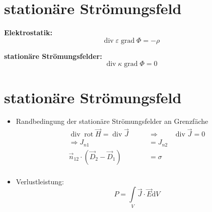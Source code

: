 \documentclass[nochapterpage,bigchapter,linedtoc,longdoc,colorback,accentcolor=tud2c]{tudreport}
\DeclareMathOperator{\Div}{\mathrm{div}}
\DeclareMathOperator{\Rot}{\mathrm{rot }}
\DeclareMathOperator{\Grad}{\mathrm{grad}}
\begin{document}
\section{stationäre Strömungsfeld}
\begin{minipage}[t]{0.4\linewidth}
	\textbf{Elektrostatik:}
	\begin{equation*}
		\Div \varepsilon \Grad \Phi = - \rho
	\end{equation*}
\end{minipage}
\hfill {\vrule width 1pt}\hfill %
\begin{minipage}[t]{0.4\linewidth}
	\textbf{stationäre Strömungsfelder:}
	\begin{equation*}
		\Div \kappa \Grad \Phi = 0
	\end{equation*}
\end{minipage}
\section{stationäre Strömungsfeld}
\begin{itemize}
\item	Randbedingung der stationäre Strömungsfelder an Grenzfäche
		\begin{equation*}
		\begin{aligned}
			\Div \Rot \vec{H} = \Div \vec{J}\qquad &\Rightarrow \qquad \Div \vec{J} =0 \\
			\Rightarrow J_{n1} &= J_{n2} \\
			\vec{n}_{12}\cdot(\vec{D}_2 - \vec{D}_1) &=\sigma \\
		\end{aligned}
		\end{equation*}
\item	Verlustleistung:
		\begin{equation*}
			P = \int\limits_{V}\vec{J}\cdot\vec{E}\mathrm{d}V
		\end{equation*}
\end{itemize}

\end{document}
